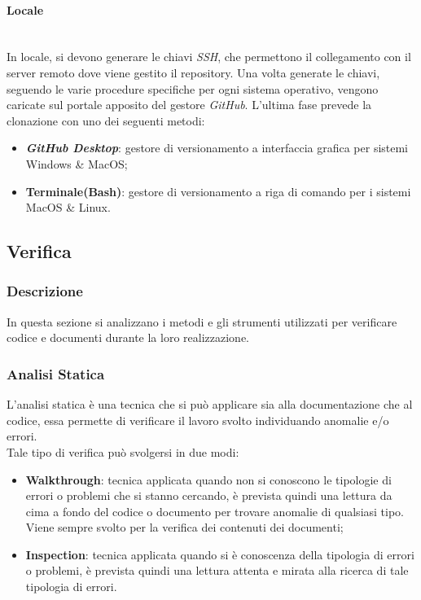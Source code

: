 \paragraph{Locale} \-\\
	In locale, si devono generare le chiavi \textit{SSH}, che permettono il collegamento con il server remoto dove viene gestito il repository.
	Una volta generate le chiavi, seguendo le varie procedure specifiche per ogni sistema operativo, vengono caricate sul portale apposito del gestore \textit{GitHub}.
	L'ultima fase prevede la clonazione con uno dei seguenti metodi:

	\begin{itemize}
		\item \textbf{\textit{GitHub Desktop}}: gestore di versionamento a interfaccia grafica per sistemi Windows \& MacOS;
		\item \textbf{Terminale(Bash)}: gestore di versionamento a riga di comando per i sistemi MacOS \& Linux.
	\end{itemize}

\subsection{Verifica}\label{verifica}
\subsubsection{Descrizione}
In questa sezione si analizzano i metodi e gli strumenti utilizzati per verificare codice e documenti durante la loro realizzazione.

\subsubsection{Analisi Statica}
L'analisi statica è una tecnica che si può applicare sia alla documentazione che al codice, essa permette di verificare il lavoro svolto individuando anomalie e/o errori.\\
Tale tipo di verifica può svolgersi in due modi:
\begin{itemize}
	\item \textbf{Walkthrough}: tecnica applicata quando non si conoscono le tipologie di errori o problemi che si stanno cercando, è prevista quindi una lettura da cima a fondo del codice o documento per trovare anomalie di qualsiasi tipo.\\
	Viene sempre svolto per la verifica dei contenuti dei documenti;
	\item \textbf{Inspection}: tecnica applicata quando si è conoscenza della tipologia di errori o problemi, è prevista quindi una lettura attenta e mirata alla ricerca di tale tipologia di errori.
\end{itemize}

